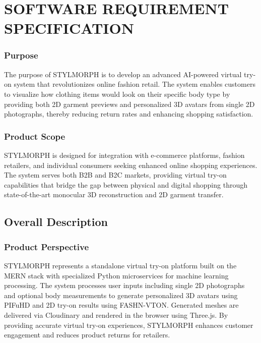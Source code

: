 \documentclass[12pt,a4paper,oneside]{report}
\begin{document}
\chapter{SOFTWARE REQUIREMENT SPECIFICATION}

\subsection{Purpose}
The purpose of STYLMORPH is to develop an advanced AI-powered virtual try-on system that revolutionizes online fashion retail. The system enables customers to visualize how clothing items would look on their specific body type by providing both 2D garment previews and personalized 3D avatars from single 2D photographs, thereby reducing return rates and enhancing shopping satisfaction.

\subsection{Product Scope}
STYLMORPH is designed for integration with e-commerce platforms, fashion retailers, and individual consumers seeking enhanced online shopping experiences. The system serves both B2B and B2C markets, providing virtual try-on capabilities that bridge the gap between physical and digital shopping through state-of-the-art monocular 3D reconstruction and 2D garment transfer.

\section{Overall Description}

\subsection{Product Perspective}
STYLMORPH represents a standalone virtual try-on platform built on the MERN stack with specialized Python microservices for machine learning processing. The system processes user inputs including single 2D photographs and optional body measurements to generate personalized 3D avatars using PIFuHD and 2D try-on results using FASHN-VTON. Generated meshes are delivered via Cloudinary and rendered in the browser using Three.js. By providing accurate virtual try-on experiences, STYLMORPH enhances customer engagement and reduces product returns for retailers.
\end{document}
